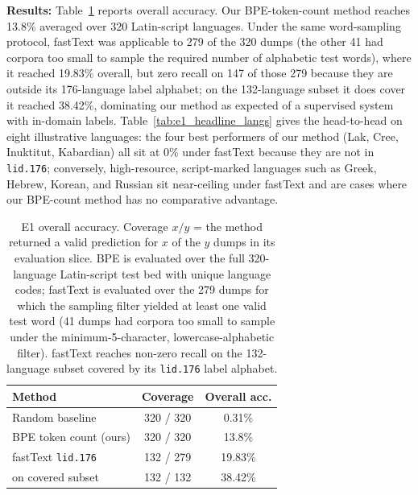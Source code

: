 \documentclass[11pt]{article}
\begin{document}
\textbf{Results:} Table~\ref{tab:e1_summary} reports overall accuracy. Our BPE-token-count method reaches 13.8\% averaged over 320 Latin-script languages. Under the same word-sampling protocol, fastText was applicable to 279 of the 320 dumps (the other 41 had corpora too small to sample the required number of alphabetic test words), where it reached 19.83\% overall, but zero recall on 147 of those 279 because they are outside its 176-language label alphabet; on the 132-language subset it does cover it reached 38.42\%, dominating our method as expected of a supervised system with in-domain labels. Table~\ref{tab:e1_headline_langs} gives the head-to-head on eight illustrative languages: the four best performers of our method (Lak, Cree, Inuktitut, Kabardian) all sit at 0\% under fastText because they are not in \texttt{lid.176}; conversely, high-resource, script-marked languages such as Greek, Hebrew, Korean, and Russian sit near-ceiling under fastText and are cases where our BPE-count method has no comparative advantage.

\begin{table}[ht]
\caption{E1 overall accuracy. Coverage $x/y$ = the method returned a valid prediction for $x$ of the $y$ dumps in its evaluation slice. BPE is evaluated over the full 320-language Latin-script test bed with unique language codes; fastText is evaluated over the 279 dumps for which the sampling filter yielded at least one valid test word (41 dumps had corpora too small to sample under the minimum-5-character, lowercase-alphabetic filter). fastText reaches non-zero recall on the 132-language subset covered by its \texttt{lid.176} label alphabet.}
\label{tab:e1_summary}
\centering
\small
\begin{tabular}{lcc}
\toprule
\textbf{Method} & \textbf{Coverage} & \textbf{Overall acc.} \\
\midrule
Random baseline & 320 / 320 & 0.31\% \\
BPE token count (ours) & 320 / 320 & 13.8\% \\
fastText \texttt{lid.176} & 132 / 279 & 19.83\% \\
\enspace on covered subset & 132 / 132 & 38.42\% \\
\bottomrule
\end{tabular}
\end{table}
\end{document}
